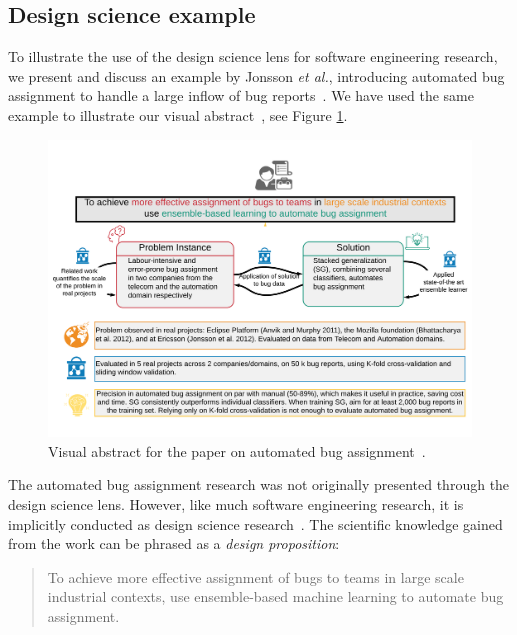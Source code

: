 \documentclass[graybox]{svmult}
\begin{document}
\subsection{Design science example}
\label{sec:examples}
To illustrate the use of the design science lens for software engineering research, we present and discuss an example by Jonsson \emph{et al.}, introducing automated bug assignment to handle a large inflow of bug reports~\cite{JonssonBug15}. We have used the same example to illustrate our visual abstract~\cite{StoreyESEM17}, see Figure \ref{fig:BugAssignment}.

\begin{figure}[t]
\begin{center}
\includegraphics[width=\columnwidth, trim={5mm 20mm 5mm 20mm },clip]{Figures/VATemplateJonsson.pdf}
\caption{Visual abstract for the paper on automated bug assignment~\cite{JonssonBug15}.}
\label{fig:BugAssignment}
\end{center}
\end{figure}

The automated bug assignment research was not originally presented through the design science lens. However, like much software engineering research, it is implicitly conducted as design science research~\cite{Engstrom19arxiv}. 
The scientific knowledge gained from the work can be phrased as a \emph{design proposition}:
\begin{quote}{To achieve more effective assignment of bugs to teams in large scale industrial contexts, use ensemble-based machine learning to automate bug assignment.~\cite{StoreyESEM17}}\end{quote}
\end{document}
